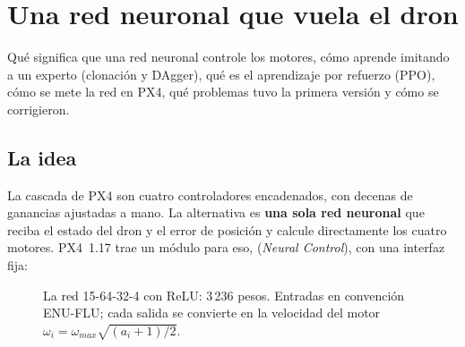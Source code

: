 \chapter{Una red neuronal que vuela el dron}
\label{cap:control-neuronal}

\begin{enpocas}
Qué significa que una red neuronal controle los motores, cómo aprende imitando a un experto
(clonación y DAgger), qué es el aprendizaje por refuerzo (PPO), cómo se mete la red en PX4, qué
problemas tuvo la primera versión y cómo se corrigieron.
\end{enpocas}

\section{La idea}

La cascada de PX4 son cuatro controladores encadenados, con decenas de ganancias ajustadas a mano. La
alternativa es \textbf{una sola red neuronal} que reciba el estado del dron y el error de posición y
calcule directamente los cuatro motores. PX4~1.17 trae un módulo para eso, 
(\emph{Neural Control}), con una interfaz fija:

\begin{figure}[H]
\centering
{}
\caption{La red 15-64-32-4 con ReLU: 3\,236 pesos. Entradas en convención ENU-FLU; cada salida se
convierte en la velocidad del motor $\omega_i = \omega_{max}\sqrt{(a_i+1)/2}$.}
\end{figure}

